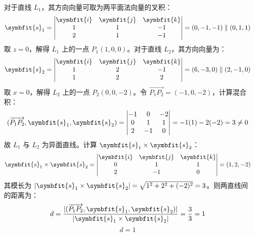 \begin{solution}
    对于直线 $L_1$，其方向向量可取为两平面法向量的叉积：
    \begin{equation}
        \symbfit{s}_1 = \begin{vmatrix} \symbfit{i} & \symbfit{j} & \symbfit{k} \\ 1 & 1 & -1 \\ 2 & 1 & -1 \end{vmatrix} = (0, -1, -1) \parallel (0, 1, 1)
    \end{equation}
    取 $z = 0$，解得 $L_1$ 上的一点 $P_1(1, 0, 0)$。对于直线 $L_2$，其方向向量为：
    \begin{equation}
        \symbfit{s}_2 = \begin{vmatrix} \symbfit{i} & \symbfit{j} & \symbfit{k} \\ 1 & 2 & -1 \\ 1 & 2 & 2 \end{vmatrix} = (6, -3, 0) \parallel (2, -1, 0)
    \end{equation}
    取 $x = 0$，解得 $L_2$ 上的一点 $P_2(0, 0, -2)$。令 $\overrightarrow{P_1P_2} = (-1, 0, -2)$，计算混合积：
    \begin{equation}
        (\overrightarrow{P_1P_2}, \symbfit{s}_1, \symbfit{s}_2) = \begin{vmatrix} -1 & 0 & -2 \\ 0 & 1 & 1 \\ 2 & -1 & 0 \end{vmatrix} = -1(1) - 2(-2) = 3 \neq 0
    \end{equation}
    故 $L_1$ 与 $L_2$ 为异面直线。计算 $\symbfit{s}_1 \times \symbfit{s}_2$：
    \begin{equation}
        \symbfit{s}_1 \times \symbfit{s}_2 = \begin{vmatrix} \symbfit{i} & \symbfit{j} & \symbfit{k} \\ 0 & 1 & 1 \\ 2 & -1 & 0 \end{vmatrix} = (1, 2, -2)
    \end{equation}
    其模长为 $|\symbfit{s}_1 \times \symbfit{s}_2| = \sqrt{1^2 + 2^2 + (-2)^2} = 3$。则两直线间的距离为：
    \begin{equation}
        d = \frac{|(\overrightarrow{P_1P_2}, \symbfit{s}_1, \symbfit{s}_2)|}{|\symbfit{s}_1 \times \symbfit{s}_2|} = \frac{3}{3} = 1
    \end{equation}
    \begin{equation}
        \boxed{d = 1}
    \end{equation}
\end{solution}


